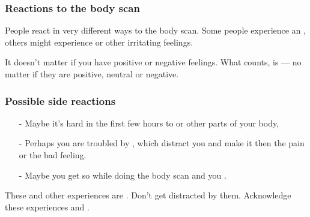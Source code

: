 \begin{frame}
\frametitle{Reactions to the body scan}

People react in very different ways to the body scan. Some people experience an , others might experience  or other irritating feelings. 

It doesn't matter if you have positive or negative feelings. What counts, is  --- no matter if they are positive, neutral or negative.
\end{frame}
\begin{frame}
\frametitle{Possible side reactions}

\begin{itemize}
\item[-] Maybe it's hard in the first few hours to  or other parts of your body,
\item[-] Perhaps you are troubled by , which distract you and make it  then the pain or the bad feeling.
\item[-] Maybe you get so  while doing the body scan and you .
\end{itemize}
These and other experiences are . Don't get distracted by them. Acknowledge these experiences and .
\end{frame}


